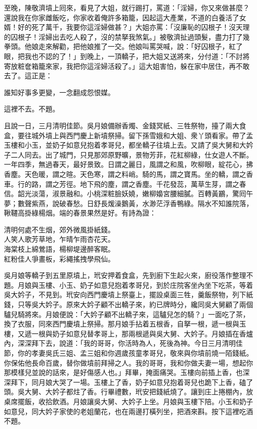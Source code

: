 至晚，陳敬濟墳上囘來，看見了大姐，就行踢打，罵道：「淫婦，你又來做甚麼？還說我在你家雌飯吃，你家收着俺許多箱籠，因起這大產業，不道的白養活了女婿！好的死了萬千，我要你這淫婦做甚？」大姐亦罵：「沒廉恥的囚根子！沒天理的囚根子！淫婦出去吃人殺了，沒的禁拏我煞氣。」被敬濟扯過頭髮，盡力打了幾拳頭。他娘走來解勸，把他娘推了一交。他娘叫罵哭喊，說：「好囚根子，紅了眼，把我也不認的了！」到晚上，一頂轎子，把大姐又送將來，分付道：「不討將寄放粧奩箱籠來家，我把你這淫婦活殺了。」{}這大姐害怕，躲在家中居住，再不敢去了。這正是：

\begin{myquote}
誰知好事多更變，一念翻成怨恨媒。
\end{myquote}

這裡不去。不題。

且說一日，三月清明佳節。吳月娘備辦香燭、金錢冥紙、三牲祭物，擡了兩大食盒，要往城外墳上與西門慶上新墳祭掃。留下孫雪娥和大姐、衆丫頭看家。帶了孟玉樓和小玉，並奶子如意兒抱着孝哥兒，都坐轎子往墳上去。又請了吳大舅和大妗子二人同去。出了城門，只見那郊原野曠，景物芳菲，花紅柳綠，仕女遊人不斷。一年四季，無過春天，最好景致。{}日謂之麗日，風謂之和風，吹柳眼，綻花心，拂香塵。天色暖，謂之暄。天色寒，謂之料峭。騎的馬，謂之寶馬。坐的轎，謂之香車。行的路，謂之芳徑。地下飛的塵，謂之香塵。千花發蕊，萬草生芽，謂之春信。韶光淡蕩，淑景融和。小桃深粧臉妖嬈，嫩柳嬝宮腰細膩。百轉黃鸝，驚囘午夢；數聲紫燕，說破春愁。日舒長煖澡鵝黃，水渺茫浮香鴨綠。隔水不知誰院落，鞦韆高掛綠楊烟。端的春景果然是好。有詩為證：

\begin{myquote}
清明何處不生烟，郊外微風掛紙錢。\\人笑人歌芳草地，乍晴乍雨杏花天。\\海棠枝上綿鶯語，楊柳堤邊醉客眠。\\紅粉佳人爭畫板，彩繩搖拽學飛仙。
\end{myquote}

吳月娘等轎子到五里原墳上，玳安押着食盒，先到廚下生起火來，{}廚役落作整理不題。月娘與玉樓、小玉、奶子如意兒抱着孝哥兒，到於庄院客坐內坐下吃茶，等着吳大妗子，不見到。玳安向西門慶墳上祭臺上，擺設桌面三牲，羹飯祭物，列下紙錢，只等吳大妗子。原來大妗子顧不出轎子來，約已牌時分，纔同吳大舅顧了兩個驢兒騎將來。{}月娘便說：「大妗子顧不出轎子來，這驢兒怎的騎？」一面吃了茶，換了衣服，同來西門慶墳上祭掃。那月娘手拈着五根香，自拏一根，遞一根與玉樓，又遞一根與奶子如意兒替孝哥上，那兩根遞與吳大舅、大妗子。月娘插在香爐內，深深拜下去，說道：「我的哥哥，你活時為人，死後為神。今日三月清明佳節，你的孝妻吳氏三姐、孟三姐和你週歲孩童孝哥兒，敬來與你墳前燒一陌錢紙。你保佑他長命百歲，替你做墳前拜掃之人。我的哥哥，我和你做夫妻一場，想起你那模樣兒並說的話來，是好傷感人也。」拜畢，掩面痛哭。玉樓向前插上香，也深深拜下，同月娘大哭了一場。玉樓上了香，奶子如意兒抱着哥兒也跪下上香，磕了頭。吳大舅、大妗子都炷了香。行畢禮數，玳安把錢紙燒了。讓到庄上捲棚內，放桌席擺飯，收拾飲酒。月娘讓吳大舅、大妗子上坐。月娘與玉樓下陪。小玉和奶子如意兒，同大妗子家使的老姐蘭花，也在兩邊打橫列坐，把酒來斟。按下這裡吃酒不題。

